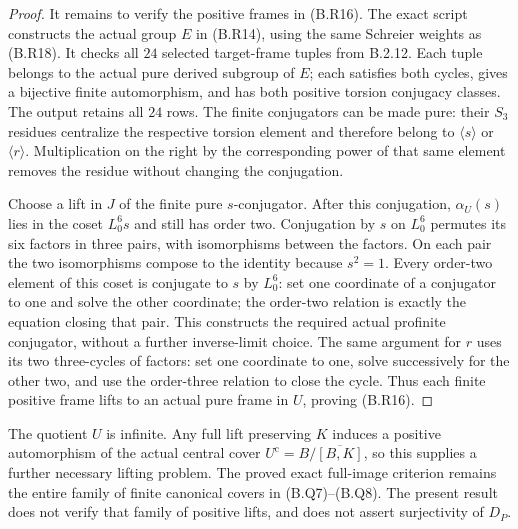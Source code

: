 \begin{proof}
It remains to verify the positive frames in (B.R16).
The exact script 
constructs the actual group $E$ in (B.R14), using the
same Schreier weights as (B.R18).  It checks all $24$
selected target-frame tuples from B.2.12.  Each tuple
belongs to the actual pure derived subgroup of $E$;
each satisfies both cycles, gives a bijective finite
automorphism, and has both positive torsion conjugacy
classes.  The output retains all $24$ rows.  The finite
conjugators can be made pure: their $S_3$ residues
centralize the respective torsion element and therefore
belong to $\langle s\rangle$ or $\langle r\rangle$.
Multiplication on the right by the corresponding power
of that same element removes the residue without changing
the conjugation.

Choose a lift in $J$ of the finite pure $s$-conjugator.
After this conjugation, $\alpha_U(s)$ lies in the coset
$L_0^6s$ and still has order two.  Conjugation by $s$ on
$L_0^6$ permutes its six factors in three pairs, with
isomorphisms between the factors.  On each pair the two
isomorphisms compose to the identity because $s^2=1$.
Every order-two element of this coset is conjugate to
$s$ by $L_0^6$: set one coordinate of a conjugator to
one and solve the other coordinate; the order-two
relation is exactly the equation closing that pair.
This constructs the required actual profinite conjugator,
without a further inverse-limit choice.  The same
argument for $r$ uses its two three-cycles of factors:
set one coordinate to one, solve successively for the
other two, and use the order-three relation to close
the cycle.  Thus each finite positive frame lifts to
an actual pure frame in $U$, proving (B.R16).
\end{proof}

The quotient $U$ is infinite.  Any full lift preserving
$K$ induces a positive automorphism of the actual central
cover $U^{\mathrm c}=B/\overline{[B,K]}$, so this supplies
a further necessary lifting problem.  The proved exact
full-image criterion remains the entire family of finite
canonical covers in (B.Q7)--(B.Q8).  The present result
does not verify that family of positive lifts, and does
not assert surjectivity of $D_P$.
